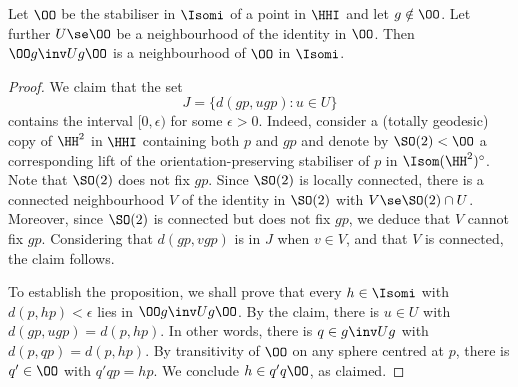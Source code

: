\begin{prop}\label{prop:auto}
Let $\OO$ be the stabiliser in $\Isomi$ of a point in $\HHI$ and let $g\notin\OO$. Let further $U\se \OO$ be a neighbourhood of the identity in $\OO$. Then $\OO g\inv U g \OO$ is a neighbourhood of $\OO$ in $\Isomi$.
\end{prop}

\begin{proof}
We claim that the set
\[
J=\big\{ d(g p, u g p) : u\in U \big\}
\]
contains the interval $[0, \epsilon)$ for some $\epsilon>0$. Indeed, consider a (totally geodesic) copy of $\HH^2$ in $\HHI$ containing both $p$ and $g p$ and denote by $\SO(2)< \OO$ a corresponding lift of the orientation-preserving stabiliser of $p$ in $\Isom(\HH^2)^\circ$. Note that $\SO(2)$ does not fix $gp$. Since $\SO(2)$ is locally connected, there is a connected neighbourhood $V$ of the identity in $\SO(2)$ with $V\se \SO(2)\cap U$. Moreover, since $\SO(2)$ is connected but does not fix $g p$, we deduce that $V$ cannot fix $g p$. Considering that $d(g p, v g p)$ is in $J$ when $v\in V$, and that $V$ is connected, the claim follows.

To establish the proposition, we shall prove that every $h\in\Isomi$ with $d(p, h p)<\epsilon$ lies in $\OO g\inv U g \OO$. By the claim, there is $u\in U$ with $d(g p, u g p)= d(p, h p)$. In other words, there is $q\in g\inv U g$ with $d(p, q p) = d(p, h p)$. By transitivity of $\OO$ on any sphere centred at $p$, there is $q'\in\OO$ with $q' q p = hp$. We conclude $h\in q' q\OO$, as claimed.
\end{proof}

